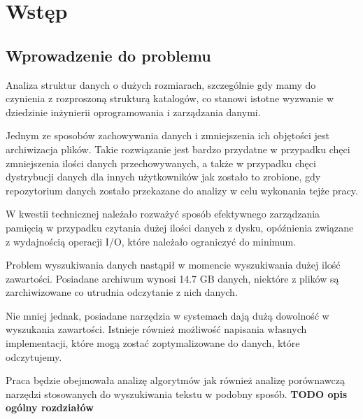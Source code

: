 \chapter{Wstęp}

\section{Wprowadzenie do problemu}
Analiza struktur danych o dużych rozmiarach, szczególnie gdy mamy do czynienia
z rozproszoną strukturą katalogów, co stanowi istotne wyzwanie w dziedzinie 
inżynierii oprogramowania i zarządzania danymi. 

Jednym ze sposobów zachowywania danych i zmniejszenia ich objętości jest 
archiwizacja plików. Takie rozwiązanie jest bardzo przydatne w przypadku chęci
zmniejszenia ilości danych przechowywanych, a także w przypadku chęci 
dystrybucji danych dla innych użytkowników jak zostało to zrobione, gdy 
repozytorium danych zostało przekazane do analizy w celu wykonania tejże pracy.

W kwestii technicznej należało rozważyć sposób efektywnego zarządzania pamięcią
w przypadku czytania dużej ilości danych z dysku, opóźnienia związane z 
wydajnością operacji I/O, które należało ograniczyć do minimum.

Problem wyszukiwania danych nastąpił w momencie wyszukiwania dużej ilość 
zawartości. Posiadane archiwum wynosi 14.7 GB danych, niektóre z plików są 
zarchiwizowane co utrudnia odczytanie z nich danych. 

Nie mniej jednak, posiadane narzędzia w systemach dają dużą dowolność w 
wyszukania zawartości. Istnieje również możliwość napisania własnych 
implementacji, które mogą zostać zoptymalizowane do danych, które odczytujemy.

Praca będzie obejmowała analizę algorytmów jak również analizę porównawczą 
narzędzi stosowanych do wyszukiwania tekstu w podobny sposób. 
\textbf{TODO opis ogólny rozdziałów} 

